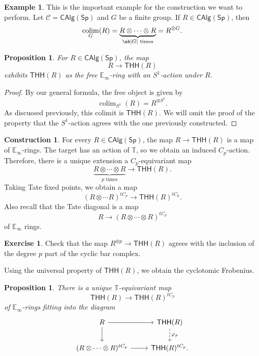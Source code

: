 \documentclass[10pt, oneside]{memoir}
\newtheorem{prop}[thm]{Proposition}
\theoremstyle{definition}
\newtheorem{con}[thm]{Construction}
\newtheorem{exm}[thm]{Example}
\newtheorem{exer}[thm]{Exercise}
\theoremstyle{remark}
\theoremstyle{plain}
\theoremstyle{definition}
\theoremstyle{remark}
\newcommand{\E}{\mathbb{E}}
\newcommand{\mc}[1]{\mathcal{#1}}
\newcommand{\T}{\mathbb{T}}
\newcommand{\ms}[1]{\mathsf{#1}}
\newcommand{\1}{\mathbf{1}}
\newcommand{\2}{\mathbf{2}}
\newcommand{\3}{\mathbf{3}}
\newcommand{\THH}{\ms{THH}}
\DeclareMathOperator*{\colim}{colim}
\begin{document}
\begin{exm}
    This is the important example for the construction we want to perform. Let $\mc{C} = \ms{CAlg}(\ms{Sp})$ and $G$ be a finite group. If $R \in \ms{CAlg}(\ms{Sp})$, then
    \[ \colim_G(R) = \underbrace{R \otimes \cdots \otimes R}_{\ab|G|\text{ times}} = R^{\otimes G}. \]
\end{exm}

\begin{prop}
    For $R \in \ms{CAlg}(\ms{Sp})$, the map
    \[ R \to \THH(R) \]
    exhibits $\THH(R)$ as the free $\E_{\infty}$-ring with an $S^1$-action under $R$.
\end{prop}

\begin{proof}
    By our general formula, the free object is given by
    \[ \colim_{S^1} (R) = R^{\otimes S^1}. \]
    As discussed previously, this colimit is $\THH(R)$. We will omit the proof of the property that the $S^1$-action agrees with the one previously constructed.
\end{proof}

\begin{con}
    For every $R \in \ms{CAlg}(\ms{Sp})$, the map $R \to \THH(R)$ is a map of $\E_{\infty}$-rings. The target has an action of $\T$, so we obtain an induced $C_p$-action. Therefore, there is a unique extension a $C_p$-equivariant map
    \[ \underbrace{R \otimes \cdots \otimes R}_{p \text{ times}} \to \THH(R). \]
    Taking Tate fixed points, we obtain a map
    \[ (R \otimes \cdots R)^{t C_p} \to \THH(R)^{t C_p}. \]
    Also recall that the Tate diagonal is a map
    \[ R \to (R \otimes \cdots \otimes R)^{t C_p} \]
    of $\E_{\infty}$ rings.
\end{con}

\begin{exer}
    Check that the map $R^{\otimes p} \to \THH(R)$ agrees with the inclusion of the degree $p$ part of the cyclic bar complex.
\end{exer}

Using the universal property of $\THH(R)$, we obtain the cyclotomic Frobenius.
\begin{prop}
    There is a unique $\T$-equivariant map
    \[ \THH(R) \to \THH(R)^{t C_p} \]
    of $\E_{\infty}$-rings fitting into the diagram
    \begin{equation*}
    \begin{tikzcd}
        R \ar{r} \ar{d} & \THH(R) \ar[dashrightarrow]{d}{\varphi_p} \\
        (R \otimes \cdots \otimes R)^{tC_p} \ar{r} & \THH(R)^{tC_p}.
    \end{tikzcd}
    \end{equation*}
\end{prop}
\end{document}
